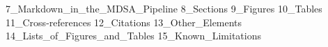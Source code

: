 {7_Markdown_in_the_MDSA_Pipeline}
{8_Sections}
{9_Figures}
{10_Tables}
{11_Cross-references}
{12_Citations}
{13_Other_Elements}
{14_Lists_of_Figures_and_Tables}
{15_Known_Limitations}
